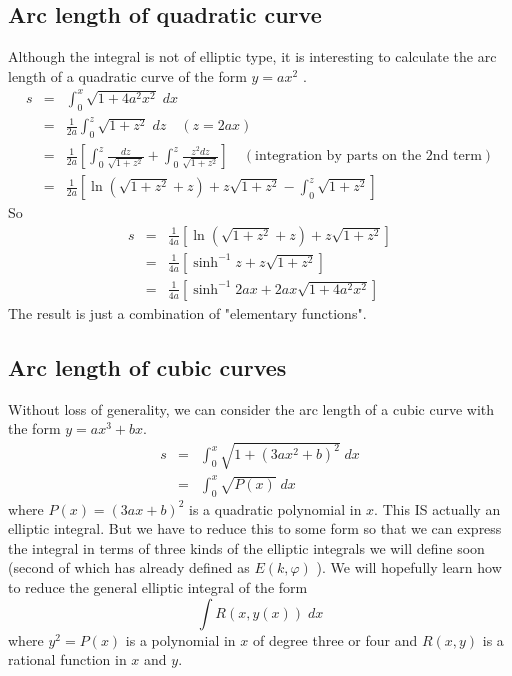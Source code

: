 \documentclass{article}
\begin{document}
\subsection{Arc length of quadratic curve}
\label{sec-2-3}
Although the integral is not of elliptic type, it is interesting to calculate the arc length of a quadratic curve of the form $y=a x^{2}$ .
\begin{eqnarray}
s &=&  \int_{0}^{x} \sqrt{ 1  + 4 a^{2} x^{2} } \; dx \\ \nonumber
  &=& \frac{1}{2a} \int_{0}^{z} \sqrt{ 1  +   z^{2}} \; dz \quad (z = 2ax) \\ \nonumber
  &=& \frac{1}{2a} \left[ \int_{0}^{z} \frac{dz}{\sqrt{1 + z^{2}}} + \int_{0}^{z} \frac{z^{2}dz}{\sqrt{1 + z^{2}}} \right]  \quad (\text{integration by parts on the 2nd term}) \\ \nonumber
  &=& \frac{1}{2a} \left[ \ln{\left( \sqrt{1 + z^{2}} + z \right)} + z\sqrt{1 + z^{2}} - \int_{0}^{z} \sqrt{1 + z^{2}} \right]
\end{eqnarray}
So
\begin{eqnarray}
s &=& \frac{1}{4a} \left[ \ln{\left( \sqrt{1 + z^{2}} + z \right)} + z\sqrt{1 + z^{2}} \right] \\ \nonumber
  &=& \frac{1}{4a} \left[ \sinh^{-1}{z} + z\sqrt{1 + z^{2}} \right] \\ \nonumber
  &=& \frac{1}{4a} \left[ \sinh^{-1}{2ax} + 2ax\sqrt{1 + 4a^{2}x^{2}} \right] 
\end{eqnarray}
The result is just a combination of "elementary functions".
\subsection{Arc length of cubic curves}
\label{sec-2-4}
Without loss of generality, we can consider the arc length of a cubic curve with the form $y = ax^{3} + bx$.
\begin{eqnarray}
s &=&  \int_{0}^{x} \sqrt{ 1  + ( 3a x^{2} + b)^{2}} \; dx \\ \nonumber
  &=& \int_{0}^{x} \sqrt{P(x)} \; dx
\end{eqnarray}
where $P(x) = (3ax +b)^{2}$ is a quadratic polynomial in $x$. This IS actually an elliptic integral. 
But we have to reduce this to some form so that we can express the integral in terms of three kinds of the elliptic integrals we will define soon (second of which has already defined as $E(k,\varphi)$ ).
We will hopefully learn how to reduce the general elliptic integral of the form
\begin{equation}
\int R(x, y(x)) \; dx
\end{equation}
where $y^{2} = P(x)$ is a polynomial in $x$ of degree three or four and $R(x,y)$ is a rational function in $x$ and $y$.
\end{document}
